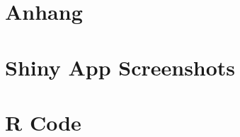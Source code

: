 \documentclass[12pt]{article}\usepackage[]{graphicx}\usepackage[]{color}
\begin{document}
\newpage
\singlespacing




\section{Anhang}
\appendix
\section{Shiny App Screenshots}
\section{R Code}
\end{document}
